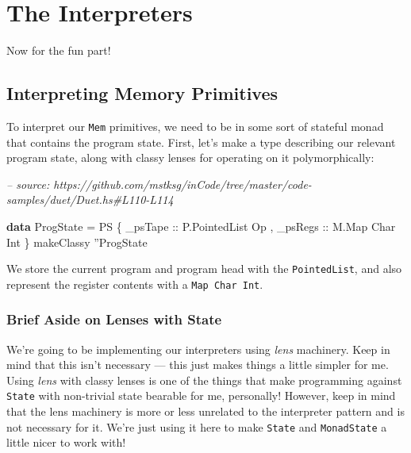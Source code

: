 \documentclass[]{article}
\newenvironment{Shaded}{}{}
\newcommand{\CharTok}[1]{\textcolor[rgb]{0.25,0.44,0.63}{#1}}
\newcommand{\CommentTok}[1]{\textcolor[rgb]{0.38,0.63,0.69}{\textit{#1}}}
\newcommand{\DataTypeTok}[1]{\textcolor[rgb]{0.56,0.13,0.00}{#1}}
\newcommand{\FunctionTok}[1]{\textcolor[rgb]{0.02,0.16,0.49}{#1}}
\newcommand{\KeywordTok}[1]{\textcolor[rgb]{0.00,0.44,0.13}{\textbf{#1}}}
\newcommand{\NormalTok}[1]{#1}
\newcommand{\OtherTok}[1]{\textcolor[rgb]{0.00,0.44,0.13}{#1}}
\begin{document}
\hypertarget{the-interpreters}{%
\section{The Interpreters}\label{the-interpreters}}

Now for the fun part!

\hypertarget{interpreting-memory-primitives}{%
\subsection{Interpreting Memory
Primitives}\label{interpreting-memory-primitives}}

To interpret our \texttt{Mem} primitives, we need to be in some sort of stateful
monad that contains the program state. First, let's make a type describing our
relevant program state, along with classy lenses for operating on it
polymorphically:

\begin{Shaded}
\begin{Highlighting}[]
\CommentTok{-- source: https://github.com/mstksg/inCode/tree/master/code-samples/duet/Duet.hs#L110-L114}

\KeywordTok{data} \DataTypeTok{ProgState} \FunctionTok{=} \DataTypeTok{PS}
\NormalTok{    \{}\OtherTok{ _psTape ::} \DataTypeTok{P.PointedList} \DataTypeTok{Op}
\NormalTok{    ,}\OtherTok{ _psRegs ::} \DataTypeTok{M.Map} \DataTypeTok{Char} \DataTypeTok{Int}
\NormalTok{    \}}
\NormalTok{makeClassy }\CharTok{''}\DataTypeTok{ProgState}
\end{Highlighting}
\end{Shaded}

We store the current program and program head with the \texttt{PointedList}, and
also represent the register contents with a \texttt{Map\ Char\ Int}.

\hypertarget{brief-aside-on-lenses-with-state}{%
\subsubsection{Brief Aside on Lenses with
State}\label{brief-aside-on-lenses-with-state}}

We're going to be implementing our interpreters using \emph{lens} machinery.
Keep in mind that this isn't necessary --- this just makes things a little
simpler for me. Using \emph{lens} with classy lenses is one of the things that
make programming against \texttt{State} with non-trivial state bearable for me,
personally! However, keep in mind that the lens machinery is more or less
unrelated to the interpreter pattern and is not necessary for it. We're just
using it here to make \texttt{State} and \texttt{MonadState} a little nicer to
work with!
\end{document}
